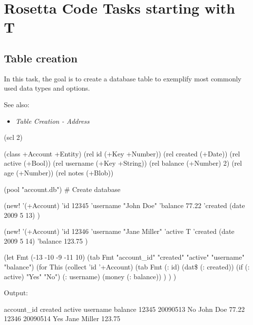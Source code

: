 %
%
%

\chapter{Rosetta Code Tasks starting with T}

\section*{Table creation}

In this task, the goal is to create a database table to exemplify most
commonly used data types and options.

See also:

\begin{itemize}
\item
  \emph{Table Creation - Address}
\end{itemize}


\begin{wideverbatim}

(scl 2)

(class +Account +Entity)
(rel id        (+Key +Number))
(rel created   (+Date))
(rel active    (+Bool))
(rel username  (+Key +String))
(rel balance   (+Number) 2)
(rel age       (+Number))
(rel notes     (+Blob))

(pool "account.db")  # Create database

(new! '(+Account)
   'id 12345
   'username "John Doe"
   'balance 77.22
   'created (date 2009 5 13) )

(new! '(+Account)
   'id 12346
   'username "Jane Miller"
   'active T
   'created (date 2009 5 14)
   'balance 123.75 )

(let Fmt (-13 -10 -9 -11 10)
   (tab Fmt "account_id" "created" "active" "username" "balance")
   (for This (collect 'id '+Account)
      (tab Fmt
         (: id)
         (dat\$ (: created))
         (if (: active) "Yes" "No")
         (: username)
         (money (: balance)) ) ) )

Output:

account_id   created   active   username      balance
12345        20090513  No       John Doe        77.22
12346        20090514  Yes      Jane Miller    123.75

\end{wideverbatim}

